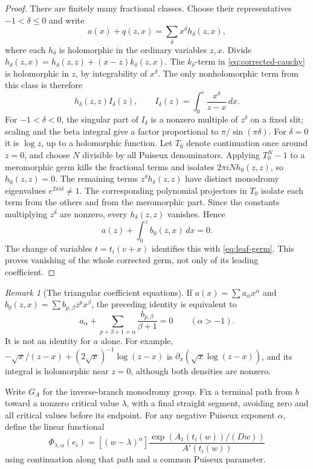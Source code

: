 \documentclass[11pt]{article}
\numberwithin{equation}{section}
\theoremstyle{definition}\newtheorem{definition}[theorem]{Definition}
\theoremstyle{remark}\newtheorem{remark}[theorem]{Remark}
\newcommand{\dd}{\,d}
\begin{document}
\begin{proof}
There are finitely many fractional classes. Choose their representatives
$-1<\delta\le0$ and write
\[
 a(x)+q(z,x)=\sum_\delta x^\delta h_\delta(z,x),
\]
where each $h_\delta$ is holomorphic in the ordinary variables $z,x$.
Divide
$h_\delta(z,x)=h_\delta(z,z)+(x-z)k_\delta(z,x)$.
The $k_\delta$-term in \eqref{eq:corrected-cauchy} is holomorphic in $z$,
by integrability of $x^\delta$. The only nonholomorphic term from this
class is therefore
\[
 h_\delta(z,z)I_\delta(z),\qquad
 I_\delta(z)=\int_0^\epsilon\frac{x^\delta}{z-x}\dd x.
\]
For $-1<\delta<0$, the singular part of $I_\delta$ is a nonzero multiple
of $z^\delta$ on a fixed slit; scaling and the beta integral give a factor
proportional to $\pi/\sin(\pi\delta)$. For $\delta=0$ it is $\log z$,
up to a holomorphic function. Let $T_0$ denote continuation once around
$z=0$, and choose $N$ divisible by all Puiseux denominators. Applying
$T_0^N-1$ to a meromorphic germ kills the fractional terms and isolates
$2\pi iN h_0(z,z)$, so $h_0(z,z)=0$. The remaining terms
$z^\delta h_\delta(z,z)$ have distinct monodromy eigenvalues
$e^{2\pi i\delta}\ne1$. The corresponding polynomial projectors in
$T_0$ isolate each term from the others and from the meromorphic part.
Since the constants multiplying $z^\delta$ are nonzero, every
$h_\delta(z,z)$ vanishes. Hence
\[
 a(z)+\int_0^z b_0(z,x)\dd x=0.
\]
The change of variables $t=t_i(v+x)$ identifies this with
\eqref{eq:leaf-germ}. This proves vanishing of the whole corrected germ,
not only of its leading coefficient.
\end{proof}

\begin{remark}[The triangular coefficient equations]\label{rem:triangular}
If $a(x)=\sum a_\alpha x^\alpha$ and
$b_0(z,x)=\sum b_{p,\beta}z^p x^\beta$, the preceding identity is equivalent to
\begin{equation}\label{eq:triangular}
 a_\alpha+\sum_{p+\beta+1=\alpha}\frac{b_{p,\beta}}{\beta+1}=0
 \qquad(\alpha>-1).
\end{equation}
It is not an identity for $a$ alone. For example,
$-\sqrt{x}/(z-x)+(2\sqrt{x})^{-1}\log(z-x)$ is
$\partial_x(\sqrt{x}\log(z-x))$, and its integral is holomorphic near
$z=0$, although both densities are nonzero.
\end{remark}

Write $G_A$ for the inverse-branch monodromy group. Fix a terminal path
from $b$ toward a nonzero critical value $\lambda$, with a final straight
segment, avoiding zero and all critical values before its endpoint.
For any negative Puiseux exponent $\alpha$, define the linear functional
\begin{equation}\label{eq:coefficient-functional}
 \Phi_{\lambda,\alpha}(e_i)=
 [(w-\lambda)^\alpha]
 \frac{\exp(A_1(t_i(w))/(Dw))}{A'(t_i(w))}
\end{equation}
using continuation along that path and a common Puiseux parameter.
\end{document}
